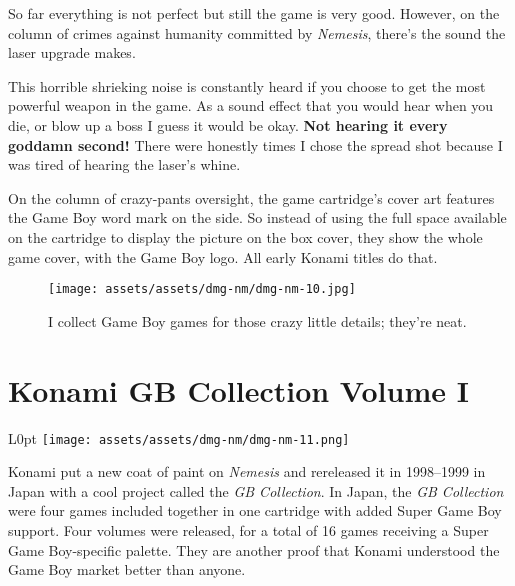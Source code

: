 \documentclass{book}
\begin{document}
So far everything is not perfect but still the game is very good. However, on the column of crimes against humanity committed by \emph{Nemesis}, there’s the sound the laser upgrade makes.



This horrible shrieking noise is constantly heard if you choose to get the most powerful weapon in the game. As a sound effect that you would hear when you die, or blow up a boss I guess it would be okay. \textbf{Not hearing it every goddamn second!} There were honestly times I chose the spread shot because I was tired of hearing the laser’s whine.

On the column of crazy-pants oversight, the game cartridge’s cover art features the Game Boy word mark on the side. So instead of using the full space available on the cartridge to display the picture on the box cover, they show the whole game cover, with the Game Boy logo. All early Konami titles do that.

\begin{figure}[hbt]
\vskip 10pt
\centering \texttt{[image: assets/assets/dmg-nm/dmg-nm-10.jpg]}\par\pagetwodescription I collect Game Boy games for those crazy little details; they’re neat.
\vskip 6pt
\end{figure}

\FloatBarrier\needspace{10mm}\section*{Konami GB Collection Volume I}\nopagebreak[4]

\begin{wrapfigure}{L}{0pt} \texttt{[image: assets/assets/dmg-nm/dmg-nm-11.png]}\end{wrapfigure}
Konami put a new coat of paint on \emph{Nemesis} and rereleased it in 1998–1999 in Japan with a cool project called the \emph{GB Collection}. In Japan, the \emph{GB Collection} were four games included together in one cartridge with added Super Game Boy support. Four volumes were released, for a total of 16 games receiving a Super Game Boy-specific palette. They are another proof that Konami understood the Game Boy market better than anyone.
\end{document}
